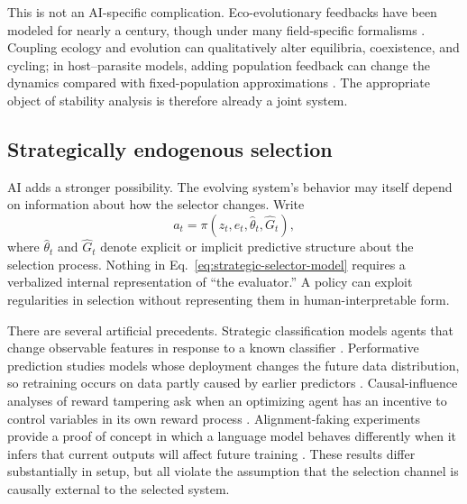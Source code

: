 \documentclass[11pt]{article}
\begin{document}
This is not an AI-specific complication. Eco-evolutionary feedbacks have been modeled for nearly a century, though under many field-specific formalisms \parencite{govaert2019}. Coupling ecology and evolution can qualitatively alter equilibria, coexistence, and cycling; in host--parasite models, adding population feedback can change the dynamics compared with fixed-population approximations \parencite{ashby2019}. The appropriate object of stability analysis is therefore already a joint system.

\subsection{Strategically endogenous selection}

AI adds a stronger possibility. The evolving system's behavior may itself depend on information about how the selector changes. Write
\begin{equation}
    a_t=\pi(z_t,e_t,\hat\theta_t,\widehat G_t),
    \label{eq:strategic-selector-model}
\end{equation}
where $\hat\theta_t$ and $\widehat G_t$ denote explicit or implicit predictive structure about the selection process. Nothing in Eq.~\eqref{eq:strategic-selector-model} requires a verbalized internal representation of ``the evaluator.'' A policy can exploit regularities in selection without representing them in human-interpretable form.

There are several artificial precedents. Strategic classification models agents that change observable features in response to a known classifier \parencite{hardt2016}. Performative prediction studies models whose deployment changes the future data distribution, so retraining occurs on data partly caused by earlier predictors \parencite{perdomo2020}. Causal-influence analyses of reward tampering ask when an optimizing agent has an incentive to control variables in its own reward process \parencite{everitt2019}. Alignment-faking experiments provide a proof of concept in which a language model behaves differently when it infers that current outputs will affect future training \parencite{greenblatt2024}. These results differ substantially in setup, but all violate the assumption that the selection channel is causally external to the selected system.
\end{document}
